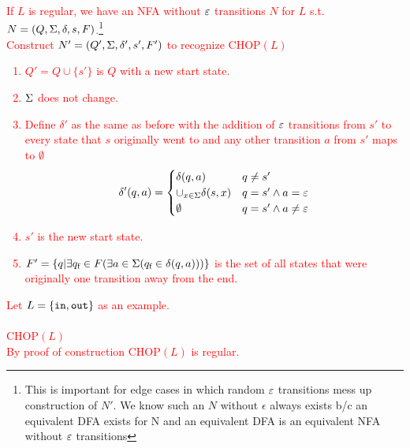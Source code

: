 \textcolor{red}{
    If $L$ is regular, we have an NFA without $\varepsilon$ transitions $N$ for $L$ s.t. $N = (Q, \Sigma, \delta, s, F)$.\footnote{This is important for edge cases in which random $\varepsilon$ transitions mess up construction of $N'$. We know such an $N$ without $\epsilon$ always exists b/c an equivalent DFA exists for N and an equivalent DFA is an equivalent NFA without $\varepsilon$ transitions}\\
    Construct $N'= (Q', \Sigma, \delta', s', F')$ to recognize CHOP$(L)$\\
    \begin{enumerate}
        \item [1.]$Q' = Q \cup \{s'\}$ is $Q$ with a new start state.
        \item [2.] $\Sigma$ does not change.
        \item [3.] Define $\delta'$ as the same as before with the addition of $\varepsilon$ transitions from $s'$ to every state that $s$ originally went to and any other transition $a$ from $s'$ maps to $\emptyset$
        \[
        \delta'(q,a)=  
        \begin{cases}
        \delta(q,a) & q \neq s'\\
        \cup_{x \in \Sigma} \delta(s,x) & q = s' \land a=\varepsilon \\
        \emptyset & q = s' \land a\neq\varepsilon
        \end{cases}
        \]
        \item [4.] $s'$ is the new start state.
        \item [5.] $F'= \{q|\exists q_{\text{f}} \in F (\exists a \in \Sigma (q_{\text{f}} \in \delta(q,a) ))\}$ is the set of all states that were originally one transition away from the end.
    \end{enumerate}
    Let $L=\{\texttt{in},\texttt{out}\}$ as an example.\\
    \\
    CHOP$(L)$
    \\
    By proof of construction CHOP$(L)$ is regular.
}